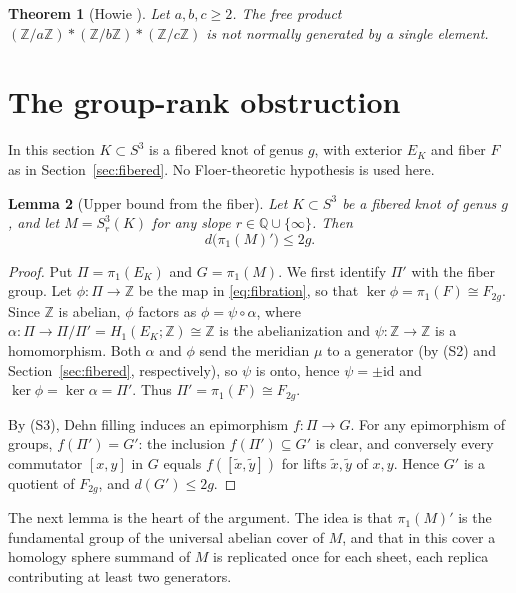 \documentclass[11pt]{article}
\newcommand{\Z}{\mathbb Z}
\newcommand{\Q}{\mathbb Q}
\newcommand{\Surg}[2]{S^3_{#1}(#2)}
\newcommand{\rk}{d}
\newtheorem{theorem}{Theorem}[section]
\newtheorem{lemma}[theorem]{Lemma}
\theoremstyle{definition}
\theoremstyle{remark}
\begin{document}
\begin{theorem}[Howie {\cite{Howie2002}}]\label{thm:howie}
Let \(a,b,c\geq2\). The free product
\((\Z/a\Z)*(\Z/b\Z)*(\Z/c\Z)\) is not normally generated by a single
element.
\end{theorem}

\section{The group-rank obstruction}\label{sec:rank}

In this section \(K\subset S^3\) is a fibered knot of genus \(g\), with
exterior \(E_K\) and fiber \(F\) as in Section~\ref{sec:fibered}. No
Floer-theoretic hypothesis is used here.

\begin{lemma}[Upper bound from the fiber]\label{lem:fiber}
Let \(K\subset S^3\) be a fibered knot of genus \(g\), and let
\(M=\Surg{r}{K}\) for any slope \(r\in\Q\cup\{\infty\}\). Then
\[
 \rk\bigl(\pi_1(M)'\bigr)\leq 2g.
\]
\end{lemma}

\begin{proof}
Put \(\Pi=\pi_1(E_K)\) and \(G=\pi_1(M)\). We first identify \(\Pi'\)
with the fiber group. Let \(\phi\colon\Pi\to\Z\) be the map in
\eqref{eq:fibration}, so that \(\ker\phi=\pi_1(F)\cong F_{2g}\). Since
\(\Z\) is abelian, \(\phi\) factors as \(\phi=\psi\circ\alpha\), where
\(\alpha\colon\Pi\to\Pi/\Pi'=H_1(E_K;\Z)\cong\Z\) is the abelianization
and \(\psi\colon\Z\to\Z\) is a homomorphism. Both \(\alpha\) and
\(\phi\) send the meridian \(\mu\) to a generator (by (S2) and
Section~\ref{sec:fibered}, respectively), so \(\psi\) is onto, hence
\(\psi=\pm\mathrm{id}\) and \(\ker\phi=\ker\alpha=\Pi'\). Thus
\(\Pi'=\pi_1(F)\cong F_{2g}\).


By (S3), Dehn filling induces an epimorphism \(f\colon\Pi\to G\). For
any epimorphism of groups, \(f(\Pi')=G'\): the inclusion
\(f(\Pi')\subseteq G'\) is clear, and conversely every commutator
\([x,y]\) in \(G\) equals \(f([\tilde x,\tilde y])\) for lifts
\(\tilde x,\tilde y\) of \(x,y\). Hence \(G'\) is a quotient of
\(F_{2g}\), and \(\rk(G')\leq2g\).
\end{proof}

The next lemma is the heart of the argument. The idea is that
\(\pi_1(M)'\) is the fundamental group of the universal abelian cover of
\(M\), and that in this cover a homology sphere summand of \(M\) is
replicated once for each sheet, each replica contributing at least two
generators.
\end{document}
